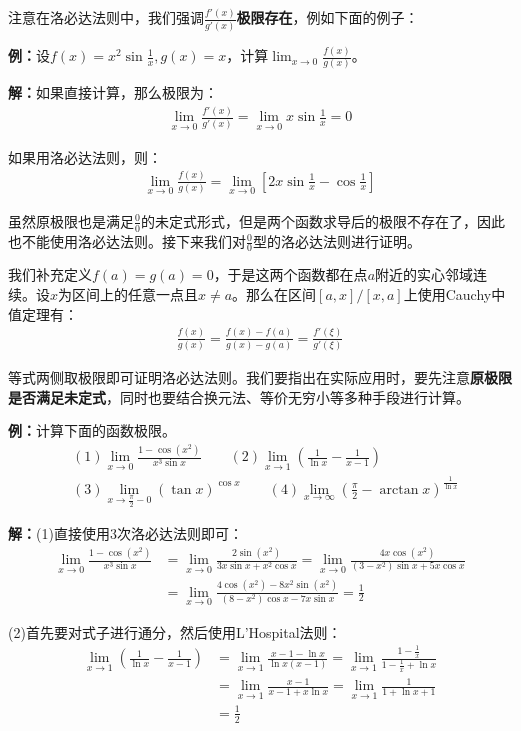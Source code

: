 \documentclass{ctexart}
\let\oldtextbf\textbf %
\renewcommand{\textbf}[1]{\textcolor{btex}{\oldtextbf{#1}}} %
\begin{document}
注意在洛必达法则中，我们强调\textbf{$\frac{f'(x)}{g'(x)}$极限存在}，例如下面的例子：

\textbf{例：}设$f(x)=x^2\sin\frac{1}{x},g(x)=x$，计算$\lim_{x\to0}\frac{f(x)}{g(x)}$。

\textbf{解：}如果直接计算，那么极限为：
\begin{align*}
    \lim_{x\to 0}\frac{f'(x)}{g'(x)}=\lim_{x\to 0}x\sin\frac{1}{x}=0
\end{align*}

如果用洛必达法则，则：
\begin{align*}
    \lim_{x\to 0}\frac{f(x)}{g(x)}=\lim_{x\to 0}[2x\sin\frac{1}{x}-\cos\frac{1}{x}]
\end{align*}

虽然原极限也是满足$\frac{0}{0}$的未定式形式，但是两个函数求导后的极限不存在了，因此也不能使用洛必达法则。接下来我们对$\frac{0}{0}$型的洛必达法则进行证明。

我们补充定义$f(a)=g(a)=0$，于是这两个函数都在点$a$附近的实心邻域连续。设$x$为区间上的任意一点且$x\neq a$。那么在区间$[a,x]/[x,a]$上使用Cauchy中值定理有：
\begin{align*}
    \frac{f(x)}{g(x)}=\frac{f(x)-f(a)}{g(x)-g(a)}=\frac{f'(\xi)}{g'(\xi)}
\end{align*}

等式两侧取极限即可证明洛必达法则。我们要指出在实际应用时，要先注意\textbf{原极限是否满足未定式}，同时也要结合换元法、等价无穷小等多种手段进行计算。

\textbf{例：}计算下面的函数极限。
\begin{align*}
&(1)\lim_{x\to 0}\frac{1-\cos (x^2)}{x^3\sin x}\qquad (2)\lim_{x\to 1}\left(\frac{1}{\ln x}-
\frac{1}{x-1}  \right) \\
&(3)\lim_{x\to \frac{\pi}{2}-0 }(\tan x)^{\cos x}\qquad (4)\lim_{x\to\infty}(\frac{\pi}{2}-\arctan x)^{
\frac{1}{\ln x}}
\end{align*}

\textbf{解：}(1)直接使用3次洛必达法则即可：
\begin{align*}
\lim_{x\to 0}\frac{1-\cos (x^2)}{x^3\sin x}&=\lim_{x\to 0}\frac{2\sin (x^2)}{3x\sin x+x^2\cos x}=
\lim_{x\to 0}\frac{4x\cos (x^2)}{(3-x^2)\sin x+5x\cos x}\\
&=\lim_{x\to 0}\frac{4\cos (x^2)-8x^2\sin(x^2)}{(8-x^2)\cos x-7x\sin x}=\frac{1}{2}
\end{align*}

(2)首先要对式子进行通分，然后使用L'Hospital法则：
\begin{align*}
\lim_{x\to 1}\left(\frac{1}{\ln x}-\frac{1}{x-1}\right)&=\lim_{x\to 1}\frac{x-1-\ln x}{\ln x(x-1)} 
=\lim_{x\to 1}\frac{1-\frac{1}{x}}{1-\frac{1}{x}+\ln x }\\
&=\lim_{x\to 1}\frac{x-1}{x-1+x\ln x}=\lim_{x\to 1}\frac{1}{1+\ln x+1}\\
&=\frac{1}{2}  
\end{align*}
\end{document}
